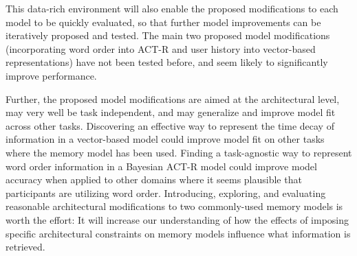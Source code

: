 \documentclass[man,floatsintext,donotrepeattitle]{apa6}
\begin{document}
This data-rich environment will also enable the proposed modifications to each model to be quickly evaluated, so that further model improvements can be iteratively proposed and tested.
The main two proposed model modifications (incorporating word order into ACT-R and user history into vector-based representations) have not been tested before, and seem likely to significantly improve performance.

Further, the proposed model modifications are aimed at the architectural level, may very well be task independent, and may generalize and improve model fit across other tasks.
Discovering an effective way to represent the time decay of information in a vector-based model could improve model fit on other tasks where the memory model has been used. 
Finding a task-agnostic way to represent word order information in a Bayesian ACT-R model could improve model accuracy when applied to other domains where it seems plausible that participants are utilizing word order.
Introducing, exploring, and evaluating reasonable architectural modifications to two commonly-used memory models is worth the effort:
It will increase our understanding of how the effects of imposing specific architectural constraints on memory models influence what information is retrieved. 

\begingroup
{}
\setlength\bibitemsep{12pt}
\clearpage
\printbibliography[heading=bibintoc]
\endgroup
\end{document}
